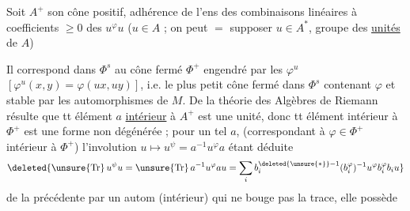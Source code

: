 Soit $A^+$ son cône positif,  adhérence
de l'ens des combinaisons linéaires à
coefficients $\geq0$ des $u^\varphi u$ ($u\in A$ ; on
peut $=$ supposer $u\in A^*$, groupe des \uline{unités} de $A$)

Il correspond dans $\Phi^s$ au cône fermé $\Phi^+$
engendré par les $\varphi^u$ $[\varphi^u(x,y)=\varphi(ux,uy)]$,
i.e. le plus petit cône fermé dans $\Phi^s$
contenant $\varphi$ et stable par les automorphismes
de $M$.  De la théorie des
Algèbres de Riemann résulte que tt
élément $a$ \uline{intérieur} à $A^+$ est une
unité, donc tt élément intérieur à $\Phi^+$
est une forme non dégénérée ;  
pour un tel $a$,  (correspondant à
$\varphi\in\Phi^+$ intérieur à $\Phi^+$) l'involution
$u\mapsto u^\psi=a^{-1}u^\varphi a$  étant déduite
\[
\deleted{\unsure{\mathrm{Tr}}\,u^\psi u=\unsure{\mathrm{Tr}}\,a^{-1}u^\varphi au=\sum_i b_i^{\deleted{\unsure{*}}-1}(b_i^\varphi)^{-1}u^\varphi b_i^\varphi b_i u}
\]
de la précédente par un autom (intérieur)
qui ne bouge pas la trace, elle  possède
